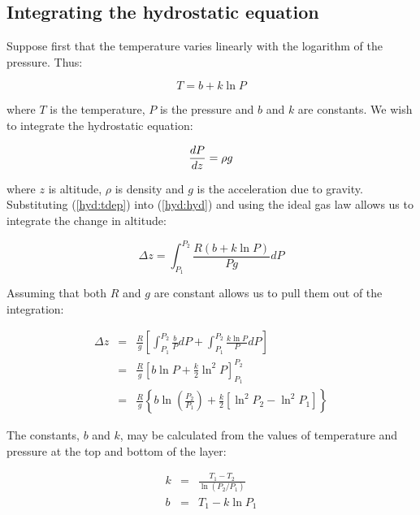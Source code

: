 \documentclass[12pt]{report}
\begin{document}
\begin{flushleft}

\section{Integrating the hydrostatic equation}

\label{hyd}

Suppose first that the temperature varies linearly with the logarithm of
the pressure.  Thus:

\begin{equation}
T = b + k \ln P
\label{hyd:tdep}
\end{equation}

where $T$ is the temperature, $P$ is the pressure and $b$ and $k$ are 
constants.  We wish to integrate the hydrostatic equation:

\begin{equation}
\frac{dP}{dz} = \rho g \linebreak
\label{hyd:hyd}
\end{equation}

where $z$ is altitude, $\rho$ is density and $g$ is the acceleration due to gravity.  Substituting (\ref{hyd:tdep}) into (\ref{hyd:hyd}) and using the ideal gas law allows us to integrate the change in altitude:

\begin{equation}
\Delta z = \int_{P_1}^{P_2} \frac{R(b + k \ln P)}{Pg} dP
\end{equation}

Assuming that both $R$ and $g$ are constant allows us to pull them out of the integration:

\begin{eqnarray}
\Delta z & = & \frac{R}{g} \left [ \int_{P_1}^{P_2} \frac{b}{P} dP + 
\int_{P_1}^{P_2} \frac{k \ln P}{P}dP \right ] \\
 & = & \frac{R}{g} \left [ b \ln P + \frac{k}{2} \ln^2 P \right ]_{P_1}^{P_2} \\
 & = & \frac{R}{g} \left \lbrace b \ln \left ( \frac{P_2}{P_1} \right ) +
 	\frac{k}{2} \left [ \ln^2 P_2 - \ln^2 P_1 \right ] \right \rbrace
\label{hyd:hyd_int}
\end{eqnarray}

The constants, $b$ and $k$, may be calculated from the values of temperature and pressure
at the top and bottom of the layer:

\begin{eqnarray}
k & = & \frac{T_1 - T_2}{\ln (P_2/P_1)} \label{hyd:kdef} \\
b & = & T_1-k \ln P_1
\end{eqnarray}


\end{flushleft}
\end{document}
